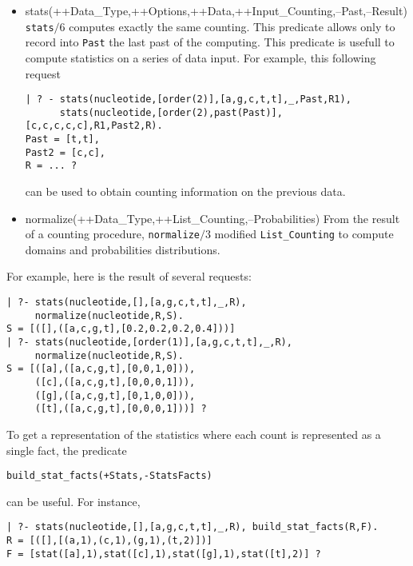 \documentclass{book}
\begin{document}
\begin{itemize}
\begin{verbatim}
     ([c,c],[(a,0),(c,3),(g,0),(t,1)]),
     ([c,g],[(a,0),(c,1),(g,0),(t,0)]),
     ([c,t],[(a,0),(c,0),(g,0),(t,1)]),
     ([g,a],[(a,0),(c,0),(g,0),(t,0)]),
     ([g,c],[(a,0),(c,0),(g,0),(t,1)]),
     ([g,g],[(a,0),(c,1),(g,0),(t,0)]),
     ([g,t],[(a,0),(c,0),(g,0),(t,1)]),
     ([t,a],[(a,0),(c,0),(g,0),(t,0)]),
     ([t,c],[(a,0),(c,0),(g,0),(t,1)]),
     ([t,g],[(a,0),(c,0),(g,0),(t,0)]),
     ([t,t],[(a,0),(c,1),(g,0),(t,0)]),
     ]?
\end{verbatim}
\item stats(++Data\_Type,++Options,++Data,++Input\_Counting,--Past,--Result)
\texttt{stats$\slash 6$} computes exactly the same counting. This predicate allows only to record
into \texttt{Past} the last past of the computing. This predicate is usefull to compute 
statistics on a series of data input. For example, this following request
\begin{verbatim}
| ? - stats(nucleotide,[order(2)],[a,g,c,t,t],_,Past,R1),
      stats(nucleotide,[order(2),past(Past)],[c,c,c,c,c],R1,Past2,R).
Past = [t,t],
Past2 = [c,c],
R = ... ?
\end{verbatim}     
can be used to obtain counting information on the previous data.
\item normalize(++Data\_Type,++List\_Counting,--Probabilities)
From the result of a counting procedure, \texttt{normalize$\slash 3$} modified \texttt{List\_Counting}
to compute domains and probabilities distributions. 
\end{itemize} 
For example, here is the result of several requests:
\begin{verbatim}
| ?- stats(nucleotide,[],[a,g,c,t,t],_,R),
     normalize(nucleotide,R,S).
S = [([],([a,c,g,t],[0.2,0.2,0.2,0.4]))]
| ?- stats(nucleotide,[order(1)],[a,g,c,t,t],_,R),
     normalize(nucleotide,R,S).
S = [([a],([a,c,g,t],[0,0,1,0])),
     ([c],([a,c,g,t],[0,0,0,1])),
     ([g],([a,c,g,t],[0,1,0,0])),
     ([t],([a,c,g,t],[0,0,0,1]))] ?
\end{verbatim}

To get a representation of the statistics where each count is represented
as a single fact, the predicate
\begin{verbatim}
build_stat_facts(+Stats,-StatsFacts)
\end{verbatim}
\noindent 
can be useful. For instance,
\begin{verbatim}
| ?- stats(nucleotide,[],[a,g,c,t,t],_,R), build_stat_facts(R,F).
R = [([],[(a,1),(c,1),(g,1),(t,2)])]
F = [stat([a],1),stat([c],1),stat([g],1),stat([t],2)] ?	
\end{verbatim}
\end{document}

